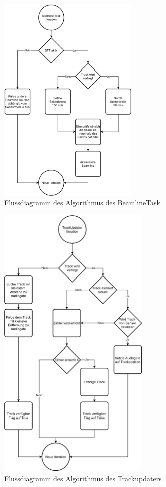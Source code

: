 \begin{figure}[h]
    \centering
    \includegraphics[width=0.6\textwidth]{content/assets/BeamlineTaskSTT.png}
    \caption{Flussdiagramm des Algorithmus des BeamlineTask}
\end{figure}

\begin{figure}[h]
    \centering
    \includegraphics[width=0.65\textwidth]{content/assets/TrackUpdaterSTT.png}
    \caption{Flussdiagramm des Algorithmus des Trackupdaters}
\end{figure}

